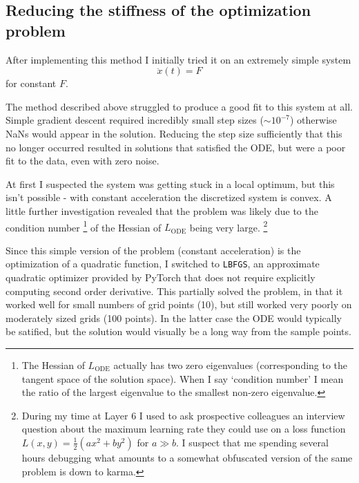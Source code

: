 \documentclass{article}
\begin{document}
\subsection{Reducing the stiffness of the optimization problem}

After implementing this method I initially tried it on an extremely simple system
$$
\ddot{x}(t) = F
$$
for constant $F$.

The method described above struggled to produce a good fit to this system at all.
Simple gradient descent required incredibly small step sizes ($\sim 10^{-7}$) otherwise NaNs would appear in the solution.
Reducing the step size sufficiently that this no longer occurred resulted in solutions that satisfied the ODE, but were a poor fit to the data, even with zero noise.

At first I suspected the system was getting stuck in a local optimum, but this isn't possible - with constant acceleration the discretized system is convex.
A little further investigation revealed that the problem was likely due to the condition number%
\footnote{
The Hessian of $L_{\mathrm{ODE}}$ actually has two zero eigenvalues (corresponding to the tangent space of the solution space). When I say `condition number' I mean the ratio of the largest eigenvalue to the smallest non-zero eigenvalue.
}
 of the Hessian of $L_{\mathrm{ODE}}$ being very large.%
\footnote{
During my time at Layer 6 I used to ask prospective colleagues an interview question about the maximum learning rate they could use on a loss function $L(x, y) = \frac{1}{2} \left( a x^2 + b y^2 \right)$ for $ a \gg b$.
I suspect that me spending several hours debugging what amounts to a somewhat obfuscated version of the same problem is down to karma.
}

Since this simple version of the problem (constant acceleration) is the optimization of a quadratic function, I switched to \texttt{LBFGS}, an approximate quadratic optimizer provided by PyTorch that does not require explicitly computing second order derivative.
This partially solved the problem, in that it worked well for small numbers of grid points (10), but still worked very poorly on moderately sized grids (100 points).
In the latter case the ODE would typically be satified, but the solution would visually be a long way from the sample points.
\end{document}
